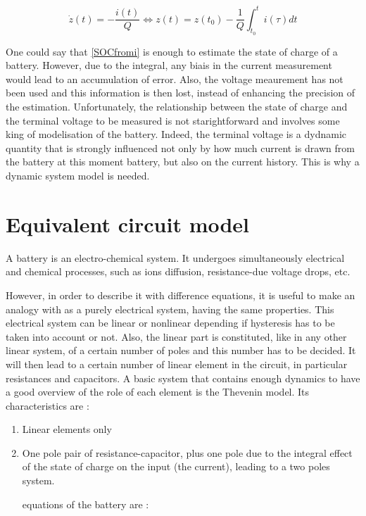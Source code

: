 \documentclass{article}
\begin{document}
\begin{equation}
    \dot{z}(t) = -\frac{i(t)}{Q} \Leftrightarrow z(t) = z(t_0) - \frac{1}{Q} \int_{t_0}^t i(\tau) dt
\label{SOCfromi}
\end{equation}

One could say that \ref{SOCfromi} is enough to estimate the state of charge of a battery. However, due to the integral, any biais in the current measurement would lead to an accumulation of error. Also, the voltage meaurement has not been used and this information is then lost, instead of enhancing the precision of the estimation.
Unfortunately, the relationship between the state of charge and the terminal voltage to be measured is not starightforward and involves some king of modelisation of the battery. Indeed, the terminal voltage is a dydnamic quantity that is strongly influenced not only by how much current is drawn from the battery at this moment battery, but also on the current history. This is why a dynamic system model is needed. 


\section{Equivalent circuit model}

A battery is an electro-chemical system. It undergoes simultaneously electrical and chemical processes, such as ions diffusion, resistance-due voltage drops, etc. 

However, in order to describe it with difference equations, it is useful to make an analogy with as a purely electrical system, having the same properties. This electrical system can be linear or nonlinear depending if hysteresis has to be taken into account or not. Also, the linear part is constituted, like in any other linear system, of a certain number of poles and this number has to be decided. It will then lead to a certain number of linear element in the circuit, in particular resistances and capacitors. 
A basic system that contains enough dynamics to have a good overview of the role of each element is the Thevenin model. Its characteristics are : 

\begin{enumerate}
\item Linear elements only 
\item One pole pair of resistance-capacitor, plus one pole due to the integral effect of the state of charge on the input (the current), leading to a two poles system. 

equations of the battery are : 
\end{enumerate}
\end{document}
